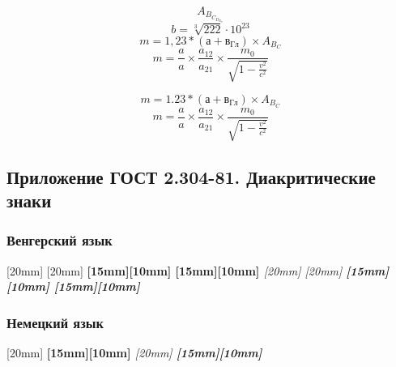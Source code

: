 \newpage
\eskdfont \eskdfontsize{14mm} \selectfont \mdseries
\papergraduate

\[A_{B_{C_{D_{E_{F}}}}}\]
\[b=\sqrt[3]{222} \cdot 10^{23} \] %
\[m = 1,23 * \left(а+в_{Гл}\right) \times A_{B_C}\]
\[m = \frac{a}{a}\times\frac{a_{12}}{a_{21}} \times \frac{m_0}{\sqrt{1-\frac{v^2}{c^2}}}\]

\eskdfont \eskdfontsize{3.5mm} \selectfont\mdseries
\[m = 1.23 * \left(а+в_{Гл}\right) \times A_{B_C}\]
\[m = \frac{a}{a}\times\frac{a_{12}}{a_{21}} \times \frac{m_0}{\sqrt{1-\frac{v^2}{c^2}}}\]

\makeatother

\newpage
\subsection{Приложение ГОСТ 2.304-81. Диакритические знаки}

\subsubsection{Венгерский язык}

{
  {
    {
      {
        [20mm]
        [20mm]
      }
    }
    {
      \bfseries
      {
        [15mm][10mm]
        [15mm][10mm]
      }
    }
  }
  {
    \slshape
    {
      {
        [20mm]
        [20mm]
      }
    }
    {
      \bfseries
      {
        [15mm][10mm]
        [15mm][10mm]
      }
    }
  }
}

\newpage
\subsubsection{Немецкий язык}

{
  {
    {
      {
        [20mm]
      }
    }
    {
      \bfseries
      {
        [15mm][10mm]
      }
    }
  }
  {
    \slshape
    {
      {
        [20mm]
      }
    }
    {
      \bfseries
      {
        [15mm][10mm]
      }
    }
  }
}

